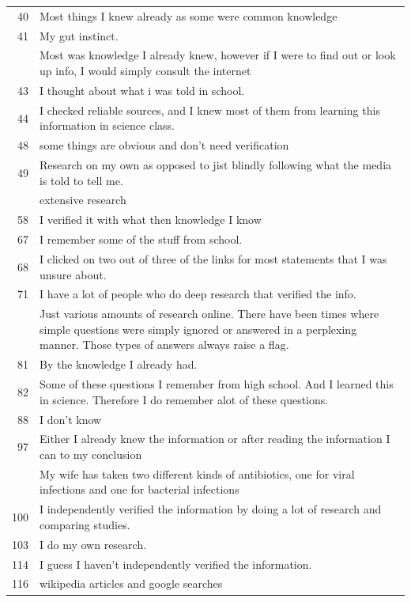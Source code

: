 \documentclass[
  doc,floatsintext]{apa6}
\begin{document}
\begin{longtable}[t]{>{}r>{\raggedright\arraybackslash}p{30em}}
40 & Most things I knew already as some were common knowledge\\
41 & My gut instinct.\\
\addlinespace
42 & Most was knowledge I already knew, however if I were to find out or look up info, I would simply consult the internet\\
43 & I thought about what i was told in school.\\
44 & I checked reliable sources, and I knew most of them from learning this information in science class.\\
48 & some things are obvious and don't need verification\\
49 & Research on my own as opposed to jist blindly following what the media is told to tell me.\\
\addlinespace
56 & extensive research\\
58 & I verified it with what then knowledge I know\\
67 & I remember some of the stuff from school.\\
68 & I clicked on two out of three of the links for most statements that I was unsure about.\\
71 & I have a lot of people who do deep research that verified the info.\\
\addlinespace
77 & Just various amounts of research online. There have been times where simple questions were simply ignored or answered in a perplexing manner. Those types of answers always raise a flag.\\
81 & By  the knowledge I already had.\\
82 & Some of these questions I remember from high school. And I learned this in science. Therefore I do remember alot of these questions.\\
88 & I don't know\\
97 & Either I already knew the information or after reading the information I can to my conclusion\\
\addlinespace
98 & My wife has taken two different kinds of antibiotics, one for viral infections and one for bacterial infections\\
100 & I independently verified the information by doing a lot of research and comparing studies.\\
103 & I do my own research.\\
114 & I guess I haven't independently verified the information.\\
116 & wikipedia articles and google searches\\

\end{longtable}
\end{document}
